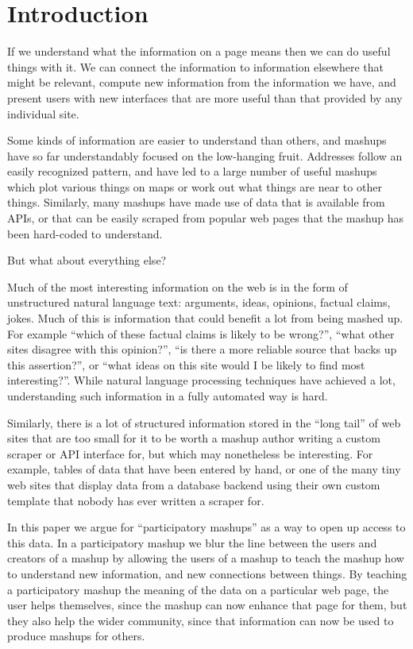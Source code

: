 \documentclass{chi2009}
\begin{document}
\section{Introduction}

If we understand what the information on a page means then we can do useful things with it. We can connect the information to information elsewhere that might be relevant, compute new information from the information we have, and present users with new interfaces that are more useful than that provided by any individual site. 

Some kinds of information are easier to understand than others, and mashups have so far understandably focused on the low-hanging fruit. Addresses follow an easily recognized pattern, and have led to a large number of useful mashups which plot various things on maps or work out what things are near to other things. Similarly, many mashups have made use of data that is available from APIs, or that can be easily scraped from popular web pages that the mashup has been hard-coded to understand.

But what about everything else? 

Much of the most interesting information on the web is in the form of unstructured natural language text: arguments, ideas, opinions, factual claims, jokes. Much of this is information that could benefit a lot from being mashed up. For example ``which of these factual claims is likely to be wrong?'', ``what other sites disagree with this opinion?'', ``is there a more reliable source that backs up this assertion?'', or ``what ideas on this site would I be likely to find most interesting?''. While natural language processing techniques have achieved a lot, understanding such information in a fully automated way is hard.

Similarly, there is a lot of structured information stored in the ``long tail'' of web sites that are too small for it to be worth a mashup author writing a custom scraper or API interface for, but which may nonetheless be interesting. For example, tables of data that have been entered by hand, or one of the many tiny web sites that display data from a database backend using their own custom template that nobody has ever written a scraper for.

In this paper we argue for ``participatory mashups'' as a way to open up access to this data. In a participatory mashup we blur the line between the users and creators of a mashup by allowing the users of a mashup to teach the mashup how to understand new information, and new connections between things. By teaching a participatory mashup the meaning of the data on a particular web page, the user helps themselves, since the mashup can now enhance that page for them, but they also help the wider community, since that information can now be used to produce mashups for others.
\end{document}
